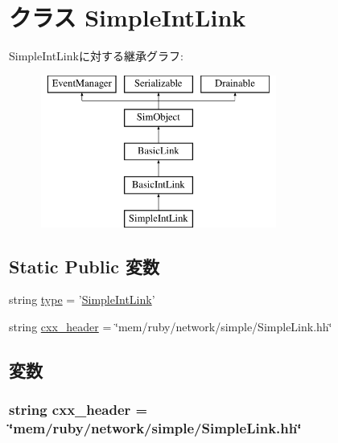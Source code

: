 \hypertarget{classSimpleLink_1_1SimpleIntLink}{
\section{クラス SimpleIntLink}
\label{classSimpleLink_1_1SimpleIntLink}
}
SimpleIntLinkに対する継承グラフ:\begin{figure}[H]
\begin{center}
\leavevmode
\includegraphics[height=5cm]{classSimpleLink_1_1SimpleIntLink}
\end{center}
\end{figure}
\subsection*{Static Public 変数}
\begin{DoxyCompactItemize}
\item 
string \hyperlink{classSimpleLink_1_1SimpleIntLink_acce15679d830831b0bbe8ebc2a60b2ca}{type} = '\hyperlink{classSimpleLink_1_1SimpleIntLink}{SimpleIntLink}'
\item 
string \hyperlink{classSimpleLink_1_1SimpleIntLink_a17da7064bc5c518791f0c891eff05fda}{cxx\_\-header} = \char`\"{}mem/ruby/network/simple/SimpleLink.hh\char`\"{}
\end{DoxyCompactItemize}


\subsection{変数}
\hypertarget{classSimpleLink_1_1SimpleIntLink_a17da7064bc5c518791f0c891eff05fda}{
\subsubsection[{cxx\_\-header}]{\setlength{\rightskip}{0pt plus 5cm}string {\bf cxx\_\-header} = \char`\"{}mem/ruby/network/simple/SimpleLink.hh\char`\"{}}}
\label{classSimpleLink_1_1SimpleIntLink_a17da7064bc5c518791f0c891eff05fda}


